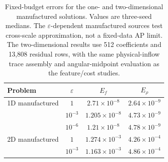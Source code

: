 \begin{table}[!htb]
\centering\small
\setlength{\tabcolsep}{7pt}
\caption{Fixed-budget errors for the one- and two-dimensional manufactured solutions. Values are three-seed medians. The $\varepsilon$-dependent manufactured sources test cross-scale approximation, not a fixed-data AP limit.
The two-dimensional results use 512 coefficients and 13,808 residual rows, with the same physical-inflow trace assembly and angular-midpoint evaluation as the feature/cost studies.}
\label{tab:knudsen-accuracy}
\begin{tabular}{lccc}
\toprule
Problem & $\varepsilon$ & $E_f$ & $E_\rho$\\
\midrule
1D manufactured & $1$ & $2.71\times10^{-8}$ & $2.64\times10^{-9}$\\
 & $10^{-3}$ & $1.205\times10^{-8}$ & $4.73\times10^{-9}$\\
 & $10^{-6}$ & $1.21\times10^{-8}$ & $4.78\times10^{-9}$\\
\addlinespace
2D manufactured & $1$ & $1.274\times10^{-3}$ & $4.26\times10^{-4}$\\
 & $10^{-3}$ & $1.163\times10^{-3}$ & $4.86\times10^{-4}$\\
\bottomrule
\end{tabular}
\end{table}


